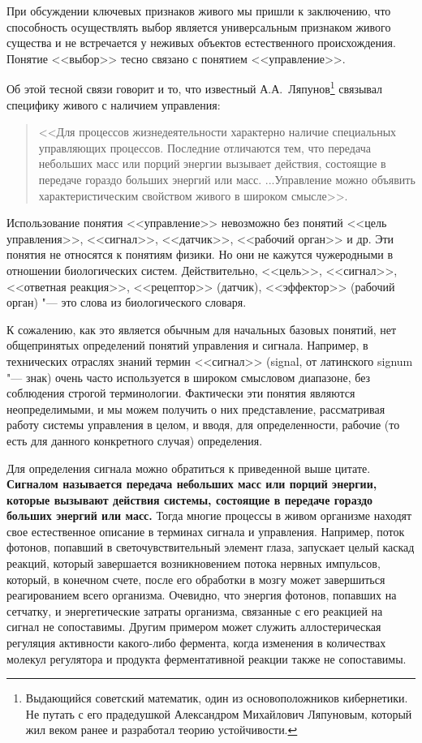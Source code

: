 \documentclass[12pt,a4paper,oneside]{book}
\begin{document}
При обсуждении ключевых признаков живого мы пришли к заключению, что способность осуществлять выбор является универсальным признаком живого существа и не встречается у неживых объектов естественного происхождения. Понятие <<выбор>> тесно связано с понятием <<управление>>.

Об этой тесной связи говорит и то, что известный А.А.~Ляпунов\footnote{Выдающийся советский математик, один из основоположников кибернетики. Не путать с его прадедушкой Александром Михайлович Ляпуновым, который жил веком ранее и разработал теорию устойчивости.} связывал специфику живого с наличием управления:
\begin{quote}
<<Для процессов жизнедеятельности характерно наличие специальных управляющих процессов. Последние отличаются тем, что передача небольших масс или порций энергии вызывает действия, состоящие в передаче гораздо больших энергий или масс. ...Управление можно объявить характеристическим свойством живого в широком смысле>>.
\end{quote}

Использование понятия <<управление>> невозможно без понятий <<цель управления>>, <<сигнал>>, <<датчик>>, <<рабочий орган>> и др. Эти понятия не относятся к понятиям физики. Но они не кажутся чужеродными в отношении биологических систем. Действительно, <<цель>>, <<сигнал>>, <<ответная реакция>>, <<рецептор>> (датчик), <<эффектор>> (рабочий орган) "--- это слова из биологического словаря.

К сожалению, как это является обычным для начальных базовых понятий, нет общепринятых определений понятий управления и сигнала. Например, в технических отраслях знаний термин <<сигнал>> (signal, от латинского signum "--- знак) очень часто используется в широком смысловом диапазоне, без соблюдения строгой терминологии. Фактически эти понятия являются неопределимыми, и мы можем получить о них представление, рассматривая работу системы управления в целом, и вводя, для определенности, рабочие (то есть для данного конкретного случая) определения.

Для определения сигнала можно обратиться к приведенной выше цитате. {\bf Сигналом называется передача небольших масс или порций энергии, которые вызывают действия системы, состоящие в передаче гораздо больших энергий или масс.} Тогда многие процессы в живом организме находят свое естественное описание в терминах сигнала и управления. Например, поток фотонов, попавший в светочувствительный элемент глаза, запускает целый каскад реакций, который завершается возникновением потока нервных импульсов, который, в конечном счете, после его обработки в мозгу может завершиться реагированием всего организма. Очевидно, что энергия фотонов, попавших на сетчатку, и энергетические затраты организма, связанные с его реакцией на сигнал не сопоставимы. Другим примером может служить аллостерическая регуляция активности какого-либо фермента, когда изменения в количествах молекул регулятора и продукта ферментативной реакции также не сопоставимы.
\end{document}
